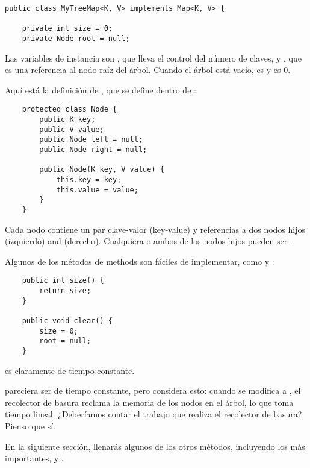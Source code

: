 \documentclass[12pt]{book}
\theoremstyle{exercise}
\begin{document}
\begin{verbatim}
public class MyTreeMap<K, V> implements Map<K, V> {

    private int size = 0;
    private Node root = null;
\end{verbatim}

Las variables de instancia son , que lleva el control del
número de claves, y , que es una referencia al nodo raíz
del árbol. Cuando el árbol está vacío,  es  y
 es 0.

Aquí está la definición de , que se define dentro de
:

\begin{verbatim}
    protected class Node {
        public K key;
        public V value;
        public Node left = null;
        public Node right = null;

        public Node(K key, V value) {
            this.key = key;
            this.value = value;
        }
    }
\end{verbatim}


Cada nodo contiene un par clave-valor (key-value) y referencias a dos
nodos hijos  (izquierdo) and  (derecho). Cualquiera
o ambos de los nodos hijos pueden ser .

Algunos de los métodos de  methods son fáciles de implementar, como
 y :

\begin{verbatim}
    public int size() {
        return size;
    }

    public void clear() {
        size = 0;
        root = null;
    }
\end{verbatim}

 es claramente de tiempo constante.


 pareciera ser de tiempo constante, pero considera esto: cuando
 se modifica a , el recolector de basura reclama la memoria
de los nodos en el árbol, lo que toma tiempo lineal. ¿Deberíamos contar el trabajo
que realiza el recolector de basura? Pienso que sí.


En la siguiente sección, llenarás algunos de los otros métodos, incluyendo
los más importantes,  y .
\end{document}
